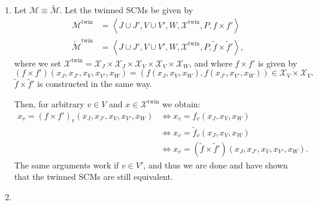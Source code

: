 \begin{gradedsolution}
\begin{enumerate}
      Finally, for $v \in T$ and arbitrary $x \in X$, we obtain:
      \begin{align*}
	x_v = f'_v(x) & \Longleftrightarrow x_v = \xi_v \\
	& \Longleftrightarrow x_v = \widetilde{f}'_v(x).
      \end{align*}
      Since $V \cup T = (V \setminus T) \cup T$, this proves the claim.
    \item Let $\mathcal{M} \equiv \widetilde{\mathcal{M}}$.
      Let the twinned SCMs be given by
      \begin{align*}
	\mathcal{M}^{\text{twin}} & = \left\langle J \cup J', V \cup V', W, \mathcal{X}^{\text{twin}}, P, f \times f' \right\rangle \\
	\widetilde{\mathcal{M}}^{\text{twin}} & = \left\langle J \cup J', V \cup V', W, \mathcal{X}^{\text{twin}}, P, \widetilde{f} \times \widetilde{f}' \right\rangle,
      \end{align*}
      where we set $\mathcal{X}^{\text{twin}} = \mathcal{X}_J \times \mathcal{X}_{J} \times \mathcal{X}_{V} \times \mathcal{X}_V \times \mathcal{X}_W$, and where $f \times f'$ is given by 
      \begin{equation*}
	(f \times f')(x_J, x_{J'}, x_V, x_{V'}, x_W) = (f(x_J, x_V, x_W), f(x_{J'}, x_{V'}, x_W)) \in \mathcal{X}_V \times \mathcal{X}_{V}.
      \end{equation*}
      $\widetilde{f} \times \widetilde{f}'$ is constructed in the same way. 
      
      Then, for arbitrary $v \in V$ and $x \in \mathcal{X}^{\text{twin}}$ we obtain:
      \begin{align*}
	x_v = (f \times f')_v(x_J, x_{J'}, x_V, x_{V'}, x_W) & \Longleftrightarrow x_v = f_v(x_J, x_V, x_W) \\
	& \Longleftrightarrow x_v = \widetilde{f}_v(x_J, x_V, x_W) \\
	& \Longleftrightarrow x_v = (\widetilde{f} \times \widetilde{f}')(x_J, x_{J'}, x_V, x_{V'}, x_W).
      \end{align*}
      The same arguments work if $v \in V'$, and thus we are done and have shown that the twinned SCMs are still equivalent.
    \item 


\end{enumerate}
\end{gradedsolution}
